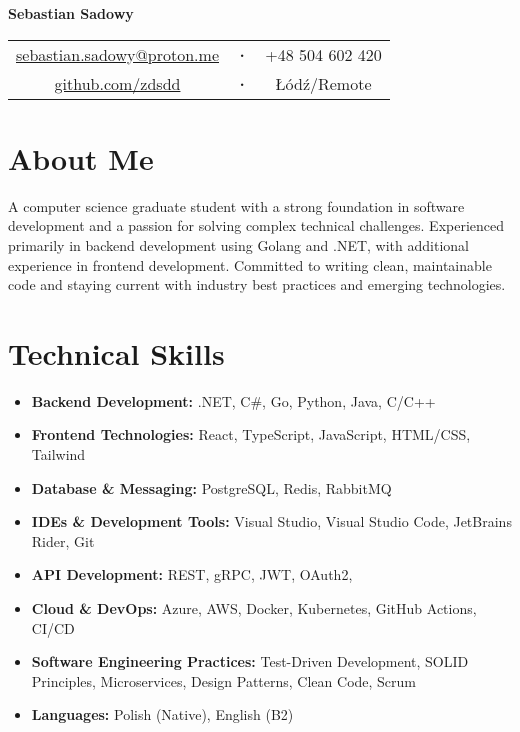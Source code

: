 \documentclass[a4paper,10pt]{article}
\begin{document}
\begin{center}
    {\Huge\textbf{Sebastian Sadowy}} \\[0.3cm]
    \begin{tabular}{c c c}
        \href{mailto:sebastian.sadowy@proton.me}{sebastian.sadowy@proton.me} & 
        \textbf{·} & 
        +48 504 602 420 \\
        \href{https://github.com/zdsdd}{github.com/zdsdd} &
        \textbf{·} &
        Łódź/Remote
    \end{tabular}
\end{center}

\section{About Me}
A computer science graduate student with a strong foundation in software development and a passion for solving complex technical challenges. Experienced primarily in backend development using Golang and .NET, with additional experience in frontend development. Committed to writing clean, maintainable code and staying current with industry best practices and emerging technologies.

\section{Technical Skills}
\begin{itemize}[leftmargin=0.5cm, itemsep=4pt]
    \item \textbf{Backend Development:} .NET, C\#, Go, Python, Java, C/C++
    \item \textbf{Frontend Technologies:} React, TypeScript, JavaScript, HTML/CSS, Tailwind
    \item \textbf{Database \& Messaging:} PostgreSQL, Redis, RabbitMQ
    \item \textbf{IDEs \& Development Tools:} Visual Studio, Visual Studio Code, JetBrains Rider, Git
    \item \textbf{API Development:} REST, gRPC, JWT, OAuth2,
    \item \textbf{Cloud \& DevOps:} Azure, AWS, Docker, Kubernetes, GitHub Actions, CI/CD
    \item \textbf{Software Engineering Practices:} Test-Driven Development, SOLID Principles, Microservices, Design Patterns, Clean Code, Scrum
    \item \textbf{Languages:} Polish (Native), English (B2)
\end{itemize}
\end{document}
